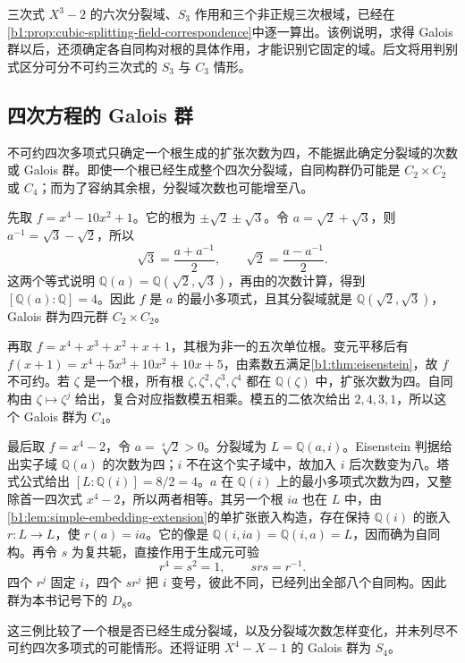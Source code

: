 \ProseParagraphBreak
三次式 \(X^3-2\) 的六次分裂域、\(S_3\) 作用和三个非正规三次根域，已经在\cref{b1:prop:cubic-splitting-field-correspondence}中逐一算出。该例说明，求得 Galois 群以后，还须确定各自同构对根的具体作用，才能识别它固定的域。后文将用判别式区分可分不可约三次式的 \(S_3\) 与 \(C_3\) 情形。

\subsection{四次方程的 Galois 群}
\label{b1:subsec:1903:02}

不可约四次多项式只确定一个根生成的扩张次数为四，不能据此确定分裂域的次数或 Galois 群。即使一个根已经生成整个四次分裂域，自同构群仍可能是 \(C_2\times C_2\) 或 \(C_4\)；而为了容纳其余根，分裂域次数也可能增至八。

\ProseParagraphBreak
先取 \(f=x^4-10x^2+1\)。它的根为 \(\pm\sqrt2\pm\sqrt3\)。令 \(a=\sqrt2+\sqrt3\)，则 \(a^{-1}=\sqrt3-\sqrt2\)，所以
\[
	\sqrt3=\frac{a+a^{-1}}2,\qquad \sqrt2=\frac{a-a^{-1}}2.
\]
这两个等式说明 \(\mathbb Q(a)=\mathbb Q(\sqrt2,\sqrt3)\)，再由的次数计算，得到 \([\mathbb Q(a):\mathbb Q]=4\)。因此 \(f\) 是 \(a\) 的最小多项式，且其分裂域就是 \(\mathbb Q(\sqrt2,\sqrt3)\)，Galois 群为四元群 \(C_2\times C_2\)。

\ProseParagraphBreak
再取 \(f=x^4+ x^3+x^2+x+1\)，其根为非一的五次单位根。变元平移后有 \(f(x+1)=x^4+5x^3+10x^2+10x+5\)，由素数五满足\cref{b1:thm:eisenstein}，故 \(f\) 不可约。若 \(\zeta\) 是一个根，所有根 \(\zeta,\zeta^2,\zeta^3,\zeta^4\) 都在 \(\mathbb Q(\zeta)\) 中，扩张次数为四。自同构由 \(\zeta\mapsto\zeta^j\) 给出，复合对应指数模五相乘。模五的二依次给出 \(2,4,3,1\)，所以这个 Galois 群为 \(C_4\)。

\ProseParagraphBreak
最后取 \(f=x^4-2\)，令 \(a=\sqrt[4]2>0\)。分裂域为 \(L=\mathbb Q(a,i)\)。Eisenstein 判据给出实子域 \(\mathbb Q(a)\) 的次数为四；\(i\) 不在这个实子域中，故加入 \(i\) 后次数变为八。塔式公式给出 \([L:\mathbb Q(i)]=8/2=4\)。\(a\) 在 \(\mathbb Q(i)\) 上的最小多项式次数为四，又整除首一四次式 \(x^4-2\)，所以两者相等。其另一个根 \(ia\) 也在 \(L\) 中，由\cref{b1:lem:simple-embedding-extension}的单扩张嵌入构造，存在保持 \(\mathbb Q(i)\) 的嵌入 \(r:L\rightarrow L\)，使 \(r(a)=ia\)。它的像是 \(\mathbb Q(i,ia)=\mathbb Q(i,a)=L\)，因而确为自同构。再令 \(s\) 为复共轭，直接作用于生成元可验
\[
	r^4=s^2=1,\qquad srs=r^{-1}.
\]
四个 \(r^j\) 固定 \(i\)，四个 \(sr^j\) 把 \(i\) 变号，彼此不同，已经列出全部八个自同构。因此群为本书记号下的 \(D_8\)。

\ProseParagraphBreak
这三例比较了一个根是否已经生成分裂域，以及分裂域次数怎样变化，并未列尽不可约四次多项式的可能情形。还将证明 \(X^4-X-1\) 的 Galois 群为 \(S_4\)。

